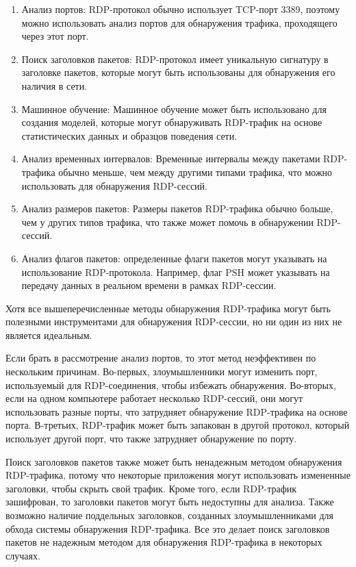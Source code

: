 \documentclass[bachelor, och, coursework]{SCWorks}
\begin{document}
\begin{enumerate}
  \item Анализ портов: RDP-протокол обычно использует TCP-порт 3389, поэтому можно использовать анализ портов для обнаружения трафика, 
  проходящего через этот порт.
  \item Поиск заголовков пакетов: RDP-протокол имеет уникальную сигнатуру в заголовке пакетов, которые могут быть использованы для 
  обнаружения его наличия в сети.
  \item Машинное обучение: Машинное обучение может быть использовано для создания моделей, которые могут обнаруживать RDP-трафик на 
  основе статистических данных и образцов поведения сети.
  \item Анализ временных интервалов: Временные интервалы между пакетами RDP-трафика обычно меньше, чем между другими типами трафика, 
  что можно использовать для обнаружения RDP-сессий.
  \item Анализ размеров пакетов: Размеры пакетов RDP-трафика обычно больше, чем у других типов трафика, что также может помочь в 
  обнаружении RDP-сессий.
  \item Анализ флагов пакетов: определенные флаги пакетов могут указывать на использование RDP-протокола. Например, флаг PSH может 
  указывать на передачу данных в реальном времени в рамках RDP-сессии.
\end{enumerate}

Хотя все вышеперечисленные методы обнаружения RDP-трафика могут быть полезными инструментами для обнаружения RDP-сессии, но ни один из них 
не является идеальным.

Если брать в рассмотрение анализ портов, то этот метод неэффективен по нескольким причинам. Во-первых, злоумышленники могут изменить порт, 
используемый для RDP-соединения, чтобы избежать обнаружения. Во-вторых, если на одном компьютере работает несколько RDP-сессий, они могут 
использовать разные порты, что затрудняет обнаружение RDP-трафика на основе порта. В-третьих, RDP-трафик может быть запакован в другой 
протокол, который использует другой порт, что также затрудняет обнаружение по порту.

Поиск заголовков пакетов также может быть ненадежным методом обнаружения RDP-трафика, потому что некоторые приложения могут использовать 
измененные заголовки, чтобы скрыть свой трафик. Кроме того, если RDP-трафик зашифрован, то заголовки пакетов могут быть недоступны для 
анализа. Также возможно наличие поддельных заголовков, созданных злоумышленниками для обхода системы обнаружения RDP-трафика. Все это 
делает поиск заголовков пакетов не надежным методом для обнаружения RDP-трафика в некоторых случаях.
\end{document}

